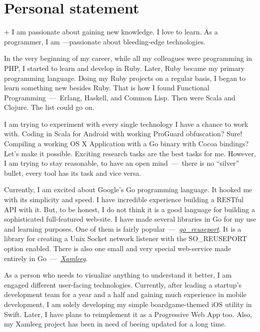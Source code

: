 \documentclass[12pt,a4paper,final]{moderncv}
\begin{document}
\section{Personal statement}
{\normalsize\parindent=1cm
  \begin{adjustwidth}{\hintscolumnwidth+\separatorcolumnwidth}{}
    I am passionate about gaining new knowledge. I love to learn. As a programmer, I am ---passionate about bleeding-edge technologies.

    In the very beginning of my career, while all my colleagues were programming in PHP, I started to learn and develop in Ruby. Later, Ruby became my primary programming language. Doing my Ruby projects on a regular basis, I began to learn something new besides Ruby. That is how I found Functional Programming~---~Erlang, Haskell, and Common Lisp. Then were Scala and Clojure. The list could go on.

    I am trying to experiment with every single technology I have a chance to work with. Coding in Scala for Android with working ProGuard obfuscation? Sure! Compiling a working OS X Application with a Go binary with Cocoa bindings? Let's make it possible. Exciting research tasks are the best tasks for me. However, I am trying to stay reasonable, to have an open mind~---~there is no ``silver'' bullet, every tool has its task and vice versa.

    Currently, I am excited about Google's Go programming language. It hooked me with its simplicity and speed. I have incredible experience building a RESTful API with it. But, to be honest, I do not think it is a good language for building a sophisticated full-featured web-site. I have made several libraries in Go for my use and learning purposes. One of them is fairly popular~---~\underline{\href{https://github.com/kavu/go\_reuseport}{\itshape go\_reuseport}}. It is a library for creating a Unix Socket network listener with the SO\_REUSEPORT option enabled. There is also one small and very special web-service made entirely in Go~---~\underline{\href{http://xamleeg.kavu.ru/}{\itshape Xamleeg}}.

    As a person who needs to visualize anything to understand it better, I am engaged different user-facing technologies. Currently, after leading a startup's development team for a year and a half and gaining much experience in mobile development, I am solely developing my simple boardgame-themed iOS utility in Swift. Later, I have plans to reimplement it as a Progressive Web App too. Also, my Xamleeg project has been in need of beeing updated for a long time.


\end{adjustwidth}}
\end{document}
